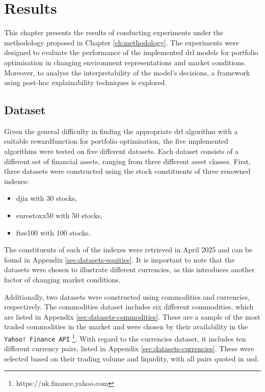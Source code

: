 \chapter{Results} \label{ch:results}

This chapter presents the results of conducting experiments under the methodology proposed in Chapter \ref{ch:methodology}. The experiments were designed to evaluate the performance of the implemented \acrshort{drl} models for portfolio optimisation in changing environment representations and market conditions. Moreover, to analyse the interpretability of the model's decisions, a framework using post-hoc explainability techniques is explored.

\section{Dataset} \label{sec:dataset}

Given the general difficulty in finding the appropriate \acrshort{drl} algorithm with a suitable \gls{rewardfunction} for portfolio optimisation, the five implemented algorithms were tested on five different datasets. Each dataset consists of a different set of financial assets, ranging from three different asset classes. First, three datasets were constructed using the stock constituents of three renowned indexes:
\begin{itemize}
    \item \acrfull{djia} with 30 stocks,
    \item \acrfull{eurostoxx50} with 50 stocks,
    \item \acrfull{ftse100} with 100 stocks.
\end{itemize}

The constituents of each of the indexes were retrieved in April 2025 and can be found in Appendix \ref{sec:datasets-equities}. It is important to note that the datasets were chosen to illustrate different currencies, as this introduces another factor of changing market conditions. 

Additionally, two datasets were constructed using commodities and currencies, respectively. The commodities dataset includes six different commodities, which are listed in Appendix \ref{sec:datasets-commodities}. These are a sample of the most traded commodities in the market and were chosen by their availability in the \texttt{Yahoo! Finance API} \footnote{https://uk.finance.yahoo.com}. With regard to the currencies dataset, it includes ten different currency pairs, listed in Appendix \ref{sec:datasets-currencies}. These were selected based on their trading volume and liquidity, with all pairs quoted in \acrfull{usd}.

